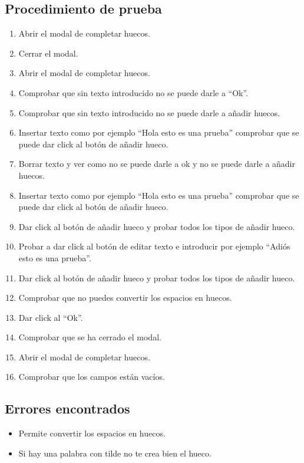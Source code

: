 \subsection{Procedimiento de prueba}
\label{procedimientoPruebas:huecos}
\begin{enumerate}
    \item Abrir el modal de completar huecos.
    \item Cerrar el modal.
    \item Abrir el modal de completar huecos.
    \item Comprobar que sin texto introducido no se puede darle a ``Ok''.
    \item Comprobar que sin texto introducido no se puede darle a añadir huecos.
    \item Insertar texto como por ejemplo ``Hola esto es una prueba'' comprobar que se puede dar click al botón de añadir hueco.
    \item Borrar texto y ver como no se puede darle a ok y no se puede darle a añadir huecos.
    \item Insertar texto como por ejemplo ``Hola esto es una prueba'' comprobar que se puede dar click al botón de añadir hueco.
    \item Dar click al botón de añadir hueco y probar todos los tipos de añadir hueco.
    \item Probar a dar click al botón de editar texto e introducir por ejemplo ``Adiós esto es una prueba''.
    \item Dar click al botón de añadir hueco y probar todos los tipos de añadir hueco.
    \item Comprobar que no puedes convertir los espacios en huecos.
    \item Dar click al ``Ok''.
    \item Comprobar que se ha cerrado el modal.
    \item Abrir el modal de completar huecos.
    \item Comprobar que los campos están vacíos.
\end{enumerate}

\subsection{Errores encontrados}
\label{errores:huecos}
\begin{itemize}
    \item Permite convertir los espacios en huecos.
    \item Si hay una palabra con tilde no te crea bien el hueco.
\end{itemize}

